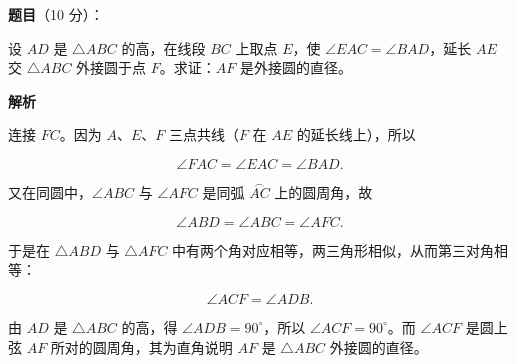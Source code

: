 \begin{answer}

\textbf{题目}（10 分）：

设 $AD$ 是 $\triangle ABC$ 的高，在线段 $BC$ 上取点 $E$，使 $\angle EAC=\angle BAD$，延长 $AE$ 交 $\triangle ABC$ 外接圆于点 $F$。求证：$AF$ 是外接圆的直径。
\nopagebreak[4]
\begin{center}\end{center}
\nopagebreak[4]
\textbf{解析}
\nopagebreak[4]
\begin{center}\end{center}
\nopagebreak[4]
连接 $FC$。因为 $A$、$E$、$F$ 三点共线（$F$ 在 $AE$ 的延长线上），所以

\nopagebreak[4]
\[
\angle FAC=\angle EAC=\angle BAD.
\]

又在同圆中，$\angle ABC$ 与 $\angle AFC$ 是同弧 $\overset{\frown}{AC}$ 上的圆周角，故

\nopagebreak[4]
\[
\angle ABD=\angle ABC=\angle AFC.
\]

于是在 $\triangle ABD$ 与 $\triangle AFC$ 中有两个角对应相等，两三角形相似，从而第三对角相等：

\nopagebreak[4]
\[
\angle ACF=\angle ADB.
\]

由 $AD$ 是 $\triangle ABC$ 的高，得 $\angle ADB=90^\circ$，所以 $\angle ACF=90^\circ$。而 $\angle ACF$ 是圆上弦 $AF$ 所对的圆周角，其为直角说明 $AF$ 是 $\triangle ABC$ 外接圆的直径。


\end{answer}
